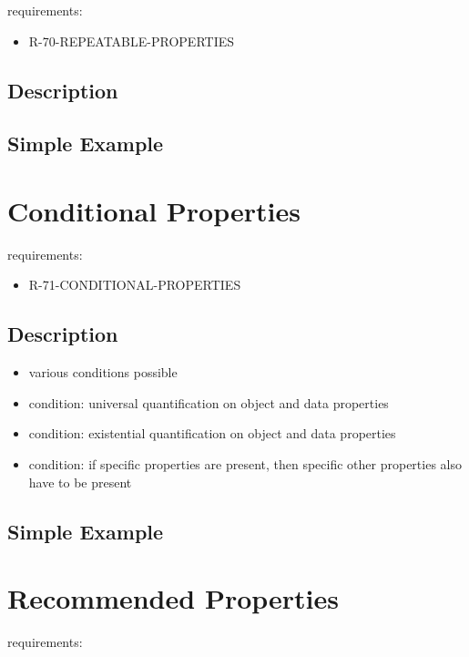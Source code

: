 \documentclass{llncs}
\begin{document}
requirements:

\begin{itemize}
	\item R-70-REPEATABLE-PROPERTIES
\end{itemize}

\subsection{Description}

\subsection{Simple Example}

\section{Conditional Properties}

requirements:

\begin{itemize}
	\item R-71-CONDITIONAL-PROPERTIES
\end{itemize}

\subsection{Description}

\begin{itemize}
	\item various conditions possible
  \item condition: universal quantification on object and data properties
  \item condition: existential quantification on object and data properties
  \item condition: if specific properties are present, then specific other properties also have to be present
\end{itemize}

\subsection{Simple Example}

\section{Recommended Properties}

requirements:
\end{document}
